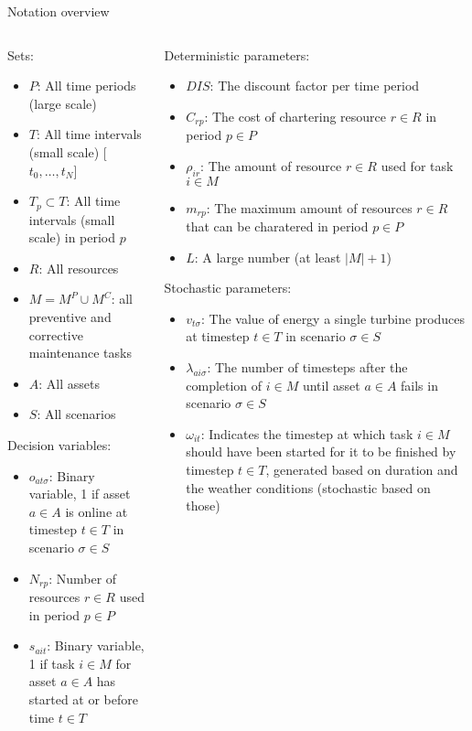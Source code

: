 \documentclass{beamer}
\begin{document}
\begin{frame}{Notation overview}
\tiny

\begin{columns}
\begin{column}{.48\textwidth}
Sets:
\begin{itemize}
\item $P$: All time periods (large scale)
\item $T$: All time intervals (small scale) [$t_0, \dots , t_N$]
\item $T_p \subset T$: All time intervals (small scale) in period $p$
\item $R$: All resources
\item $M = M^P \cup M^C$: all preventive and corrective maintenance tasks
\item $A$: All assets
\item $S$: All scenarios
\end{itemize}

Decision variables:
\begin{itemize}
\item $o_{at\sigma}$: Binary variable, 1 if asset $a \in A$ is online at timestep $t \in T$ in scenario $\sigma \in S$
\item $N_{rp}$: Number of resources $r\in R$ used in period $p \in P$
\item $s_{ait}$: Binary variable, 1 if task $i \in M$ for asset $a \in A$ has started at or before time $t \in T$
\end{itemize}
\end{column}

\hfill

\begin{column}{.48\textwidth}
Deterministic parameters:
\begin{itemize}
\item $DIS$: The discount factor per time period
\item $C_{rp}$: The cost of chartering resource $r \in R$ in period $p \in P$
\item $\rho_{ir}$: The amount of resource $r \in R$ used for task $i \in M$
\item $m_{rp}$: The maximum amount of resources $r \in R$ that can be charatered in period $p \in P$
\item $L$: A large number (at least $|M|+1$)
\end{itemize}

Stochastic parameters:
\begin{itemize}
\item $v_{t\sigma}$: The value of energy a single turbine produces at timestep $t \in T$ in scenario $\sigma \in S$
\item $\lambda_{ai\sigma}$: The number of timesteps after the completion of $i \in M$ until asset $a \in A$ fails in scenario $\sigma \in S$
\item $\omega_{it}$: Indicates the timestep at which task $i \in M$ should have been started for it to be finished by timestep $t \in T$, generated based on duration and the weather conditions (stochastic based on those)
\end{itemize}
\end{column}
\end{columns}


\end{frame}
\end{document}

